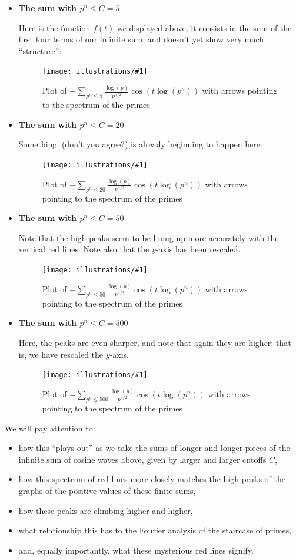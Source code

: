 \documentclass[openany]{book}
\newcommand{\ill}[3]{%
   \begin{figure}[H]%
   \vspace{-2ex}
   \centering%
   \texttt{[image: illustrations/\#1]}%
   \caption{#3}%
   \vspace{-2ex}
    \end{figure}}
\theoremstyle{plain}
\theoremstyle{definition}
\begin{document}
{\begin{enumerate}
\begin{itemize}
\item {\bf The sum with $p^n \le C=5$}

Here is the function $f(t)$ we displayed above; it consists in the sum of the first four terms of our infinite sum, and doesn't yet show very much ``structure'':

\ill{phihat_even-5}{1}{Plot of $-\sum_{p^n\leq 5}{\frac{\log(p)}{p^{n/2}}}\cos(t\log(p^n))$ with
arrows pointing to the spectrum of the primes\label{fig:pnsum5}}

\vskip20pt
\item {\bf The sum with $p^n \le C=20$}

 Something,
 (don't you agree?)  is already beginning to happen here:
\ill{phihat_even-20}{1}{Plot of $-\sum_{p^n\leq 20}{\frac{\log(p)}{p^{n/2}}}\cos(t\log(p^n))$ with arrows pointing to the spectrum of the primes}\vskip20pt
\item {\bf The sum with $p^n \le C=50$}

  Note that the high peaks seem to be lining up more accurately with
  the vertical red lines. Note also that the $y$-axis has been
  rescaled.

\ill{phihat_even-50}{1}{Plot of $-\sum_{p^n\leq 50}{\frac{\log(p)}{p^{n/2}}}\cos(t\log(p^n))$ with arrows pointing to the spectrum of the primes}\vskip20pt
\item {\bf The sum with $p^n \le C=500$}

  Here, the peaks are even sharper, and note that again they are
  higher; that is, we have rescaled the $y$-axis.
  \ill{phihat_even-500}{1}{Plot of $-\sum_{p^n\leq
      500}{\frac{\log(p)}{p^{n/2}}}\cos(t\log(p^n))$ with arrows
    pointing to the spectrum of the primes\label{fig:pnsum500}}
\end{itemize}

  We will pay attention to:

\begin{itemize}
\item how this ``plays out'' as we take the sums of longer and longer
  pieces of the infinite sum of cosine waves above, given by larger
  and larger cutoffs $C$,
\item how this spectrum of red lines more closely matches the high
  peaks of the graphs of the positive values of these finite sums,
\item how these peaks are climbing higher and higher,
\item what relationship this has to the Fourier analysis of the
  staircase of primes,
\item and, equally importantly, what these mysterious red lines
  signify.
\end{itemize}


\end{enumerate}}
\end{document}
